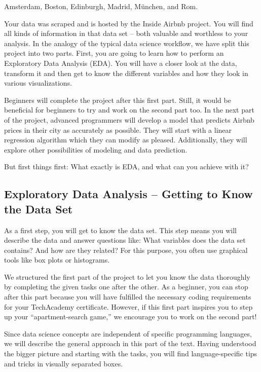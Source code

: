 \documentclass[
  11pt,
]{article}
\begin{document}
Amsterdam, Boston, Edinburgh, Madrid, München, and Rom.

Your data was scraped and is hosted by the Inside Airbnb project.
You will find all kinds of information in that data set -- both valuable and worthless to your analysis.
In the analogy of the typical data science workflow, we have split this project into two parts.
First, you are going to learn how to perform an Exploratory Data Analysis (EDA).
You will have a closer look at the data, transform it and then get to know the different variables and how they look in various visualizations.

Beginners will complete the project after this first part.
Still, it would be beneficial for beginners to try and work on the second part too.
In the next part of the project, advanced programmers will develop a model that predicts Airbnb prices in their city as accurately as possible.
They will start with a linear regression algorithm which they can modify as pleased.
Additionally, they will explore other possibilities of modeling and data prediction.

But first things first: What exactly is EDA, and what can you achieve with it?

\hypertarget{exploratory-data-analysis-getting-to-know-the-data-set}{%
\subsection{Exploratory Data Analysis -- Getting to Know the Data Set}\label{exploratory-data-analysis-getting-to-know-the-data-set}}

As a first step, you will get to know the data set.
This step means you will describe the data and answer questions like: What variables does the data set contains?
And how are they related?
For this purpose, you often use graphical tools like box plots or histograms.

We structured the first part of the project to let you know the data thoroughly by completing the given tasks one after the other.
As a beginner, you can stop after this part because you will have fulfilled the necessary coding requirements for your TechAcademy certificate.
However, if this first part inspires you to step up your ``apartment-search game,'' we encourage you to work on the second part!

Since data science concepts are independent of specific programming languages, we will describe the general approach in this part of the text.
Having understood the bigger picture and starting with the tasks, you will find language-specific tips and tricks in visually separated boxes.
\end{document}
